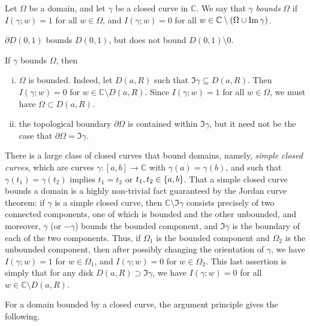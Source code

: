 \begin{definition}
	Let \( \Omega \) be a domain, and let \( \gamma \) be a closed curve in \( \mathbb C \).
	We say that \( \gamma \) \textit{bounds} \( \Omega \) if \( I(\gamma;w) = 1 \) for all \( w \in \Omega \), and \( I(\gamma;w) = 0 \) for all \( w \in \mathbb C \setminus \qty(\Omega \cup \Im \gamma) \).
\end{definition}
\begin{example}
	\( \partial D(0,1) \) bounds \( D(0,1) \), but does not bound \( D(0,1) \setminus \qty{0} \).
\end{example}
\begin{remark}
	If \( \gamma \) bounds \( \Omega \), then
	\begin{enumerate}[(i)]
		\item \( \Omega \) is bounded.
			Indeed, let \( D(a,R) \) such that \( \Im \gamma \subseteq D(a,R) \).
			Then \( I(\gamma;w) = 0 \) for \( w \in \mathbb C \setminus D(a,R) \).
			Since \( I(\gamma;w) = 1 \) for all \( w \in \Omega \), we must have \( \Omega \subset D(a,R) \).
		\item the topological boundary \( \partial \Omega \) is contained within \( \Im \gamma \), but it need not be the case that \( \partial \Omega = \Im \gamma \).
	\end{enumerate}
	There is a large class of closed curves that bound domains, namely, \textit{simple closed curves}, which are curves \( \gamma \colon [a,b] \to \mathbb C \) with \( \gamma(a) = \gamma(b) \), and such that \( \gamma(t_1) = \gamma(t_2) \) implies \( t_1 = t_2 \) or \( t_1, t_2 \in \qty{a,b} \).
	That a simple closed curve bounds a domain is a highly non-trivial fact guaranteed by the Jordan curve theorem: if \( \gamma \) is a simple closed curve, then \( \mathbb C \setminus \Im \gamma \) consists precisely of two connected components, one of which is bounded and the other unbounded, and moreover, \( \gamma \) (or \( -\gamma \)) bounds the bounded component, and \( \Im \gamma \) is the boundary of each of the two components.
	Thus, if \( \Omega_1 \) is the bounded component and \( \Omega_2 \) is the unbounded component, then after possibly changing the orientation of \( \gamma \), we have \( I(\gamma;w) = 1 \) for \( w \in \Omega_1 \), and \( I(\gamma;w) = 0 \) for \( w \in \Omega_2 \).
	This last assertion is simply that for any disk \( D(a,R) \supset \Im \gamma \), we have \( I(\gamma;w) = 0 \) for all \( w \in \mathbb C \setminus D(a,R) \).
\end{remark}
For a domain bounded by a closed curve, the argument principle gives the following.
